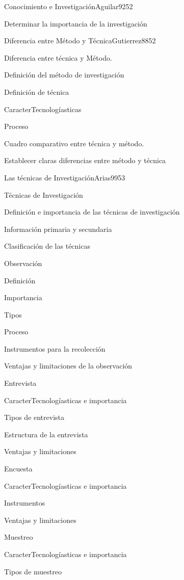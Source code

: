 \begin{syllabus}
\begin{unit}{Conocimiento e Investigación}{Aguilar92}{5}{2}
   \begin{unitgoals}
      \item Determinar la importancia de la investigación
   \end{unitgoals}
\end{unit}

\begin{unit}{Diferencia entre Método y Técnica}{Gutierrez88}{5}{2}
   \begin{topics}
      \item Diferencia entre técnica y Método.
	\item Definición del método de investigación
	\item Definición de técnica
	\item CaracterTecnologíasticas
	\item Proceso
	\item Cuadro comparativo entre técnica y método.
   \end{topics}

   \begin{unitgoals}
      \item Establecer claras diferencias entre método y técnica
   \end{unitgoals}
\end{unit}

\begin{unit}{Las técnicas de Investigación}{Arias99}{5}{3}
   \begin{topics}
      \item Técnicas de Investigación
	\item Definición e importancia de las técnicas de investigación
	\item Información primaria y secundaria
	\item Clasificación de las técnicas
	\item Observación
	\item Definición
	\item Importancia
	\item Tipos
	\item Proceso
	\item Instrumentos para la recolección 
	\item Ventajas y limitaciones de la observación
	\item Entrevista
	\item CaracterTecnologíasticas e importancia
	\item Tipos de entrevista
	\item Estructura de la entrevista
	\item Ventajas y limitaciones
	\item Encuesta
	\item CaracterTecnologíasticas e importancia
	\item Instrumentos
	\item Ventajas y limitaciones
	\item Muestreo
	\item CaracterTecnologíasticas e importancia
	\item Tipos de muestreo
   \end{topics}


\end{unit}
\end{syllabus}
